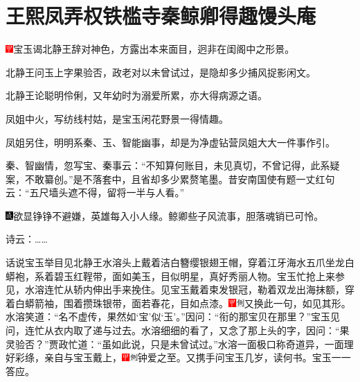 

\chapter{王熙凤弄权铁槛寺\hspace{.5em}秦鲸卿得趣馒头庵}
{\includegraphics[width=3mm]{../Images/00002}\kaishu 宝玉谒北静王辞对神色，方露出本来面目，迥非在闺阁中之形景。}

{\kaishu 北静王问玉上字果验否，政老对以未曾试过，是隐却多少捕风捉影闲文。}

{\kaishu 北静王论聪明伶俐，又年幼时为溺爱所累，亦大得病源之语。}

{\kaishu 凤姐中火，写纺线村姑，是宝玉闲花野景一得情趣。}

{\kaishu 凤姐另住，明明系秦、玉、智能幽事，却是为净虚钻营凤姐大大一件事作引。}

{\kaishu 秦、智幽情，忽写宝、秦事云：“不知算何账目，未见真切，不曾记得，此系疑案，不敢纂创。”是不落套中，且省却多少累赘笔墨。昔安南国使有题一丈红句云：“五尺墙头遮不得，留将一半与人看。”}

{\includegraphics[width=3mm]{../Images/00005}\kaishu 欲显铮铮不避嫌，英雄每入小人缘。鲸卿些子风流事，胆落魂销已可怜。}

诗云：\ldots{}\ldots{}

话说宝玉举目见北静王水溶头上戴着洁白簪缨银翅王帽，穿着江牙海水五爪坐龙白蟒袍，系着碧玉红鞓带，面如美玉，目似明星，真好秀丽人物。宝玉忙抢上来参见，水溶连忙从轿内伸出手来挽住。见宝玉戴着束发银冠，勒着双龙出海抹额，穿着白蟒箭袖，围着攒珠银带，面若春花，目如点漆。{\includegraphics[width=3mm]{../Images/00002}\includegraphics[width=3mm]{../Images/00011}\footnotesize \kaishu 又换此一句，如见其形。}水溶笑道：“名不虚传，果然如‘宝’似‘玉’。”因问：“衔的那宝贝在那里？”宝玉见问，连忙从衣内取了递与过去。水溶细细的看了，又念了那上头的字，因问：“果灵验否？”贾政忙道：“虽如此说，只是未曾试过。”水溶一面极口称奇道异，一面理好彩绦，亲自与宝玉戴上，{\includegraphics[width=3mm]{../Images/00002}\includegraphics[width=3mm]{../Images/00011}\footnotesize \kaishu 钟爱之至。}又携手问宝玉几岁，读何书。宝玉一一答应。

